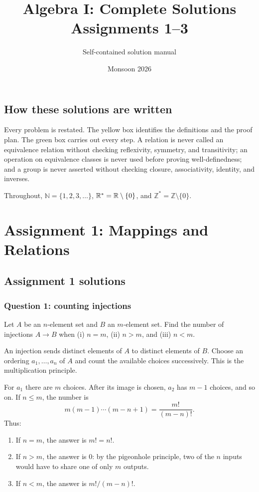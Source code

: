 \documentclass[11pt,openany]{book}
\title{Algebra I: Complete Solutions\\\large Assignments 1--3}
\author{Self-contained solution manual}
\date{Monsoon 2026}
\newcommand{\N}{\mathbb N}\newcommand{\Z}{\mathbb Z}
\begin{document}
\maketitle\tableofcontents

\chapter*{How these solutions are written}
Every problem is restated.  The yellow box identifies the definitions and the proof plan.  The green box carries out every step.  A relation is never called an equivalence relation without checking reflexivity, symmetry, and transitivity; an operation on equivalence classes is never used before proving well-definedness; and a group is never asserted without checking closure, associativity, identity, and inverses.

Throughout, $\N=\{1,2,3,\ldots\}$, $\mathbb R^*=\mathbb R\setminus\{0\}$, and $\Z^*=\Z\setminus\{0\}$.

\part{Assignment 1: Mappings and Relations}
\chapter{Assignment 1 solutions}

\section{Question 1: counting injections}
\begin{questionbox}
Let $A$ be an $n$-element set and $B$ an $m$-element set. Find the number of injections $A\to B$ when (i) $n=m$, (ii) $n>m$, and (iii) $n<m$.
\end{questionbox}
\begin{approachbox}
An injection sends distinct elements of $A$ to distinct elements of $B$. Choose an ordering $a_1,\ldots,a_n$ of $A$ and count the available choices successively. This is the multiplication principle.
\end{approachbox}
\begin{solutionbox}
For $a_1$ there are $m$ choices. After its image is chosen, $a_2$ has $m-1$ choices, and so on. If $n\le m$, the number is
\[
m(m-1)\cdots(m-n+1)=\frac{m!}{(m-n)!}.
\]
Thus:
\begin{enumerate}[label=(\roman*)]
\item If $n=m$, the answer is $m!=n!$.
\item If $n>m$, the answer is $0$: by the pigeonhole principle, two of the $n$ inputs would have to share one of only $m$ outputs.
\item If $n<m$, the answer is $m!/(m-n)!$.
\end{enumerate}
\end{solutionbox}
\end{document}
